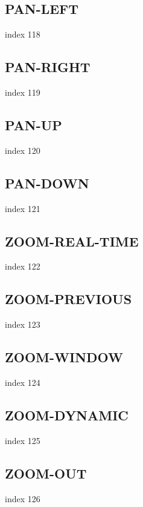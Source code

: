 \documentclass[a4paper]{report}
\begin{document}
\subsection{PAN-LEFT}

index 118

\subsection{PAN-RIGHT}

index 119

\subsection{PAN-UP}

index 120

\subsection{PAN-DOWN}

index 121

\subsection{ZOOM-REAL-TIME}

index 122

\subsection{ZOOM-PREVIOUS}

index 123

\subsection{ZOOM-WINDOW}

index 124

\subsection{ZOOM-DYNAMIC}

index 125

\subsection{ZOOM-OUT}

index 126
\end{document}
